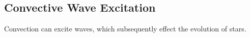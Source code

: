 {\color{purple}
\subsection{Convective Wave Excitation}
}

Convection can excite waves, which subsequently effect the evolution of stars. 
